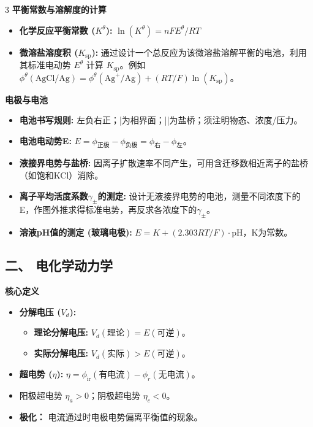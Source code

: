 \documentclass[a4paper,6pt]{article} %
\begin{document}
\begin{multicols}{3}
\textbf{平衡常数与溶解度的计算}
\begin{itemize}
    \item \textbf{化学反应平衡常数 ($K^\theta$):} $\ln(K^\theta) = nFE^\theta / RT$
    \item \textbf{微溶盐溶度积 ($K_{\text{sp}}$):} 通过设计一个总反应为该微溶盐溶解平衡的电池，利用其标准电动势 $E^\theta$ 计算 $K_{\text{sp}}$。例如 $\phi^\theta(\text{AgCl/Ag}) = \phi^\theta(\text{Ag}^+/\text{Ag}) + (RT/F)\ln(K_{\text{sp}})$。
\end{itemize}

\textbf{电极与电池}
\begin{itemize}
    \item \textbf{电池书写规则:} 左负右正；|为相界面；||为盐桥；须注明物态、浓度/压力。
    \item \textbf{电池电动势E:} $E = \phi_{\text{正极}} - \phi_{\text{负极}} = \phi_{\text{右}} - \phi_{\text{左}}$。
    \item \textbf{液接界电势与盐桥:} 因离子扩散速率不同产生，可用含迁移数相近离子的盐桥（如饱和KCl）消除。
    \item \textbf{离子平均活度系数$\gamma_\pm$的测定:} 设计无液接界电势的电池，测量不同浓度下的E，作图外推求得标准电势，再反求各浓度下的$\gamma_\pm$。
    \item \textbf{溶液pH值的测定 (玻璃电极):} $E = K + (2.303RT/F) \cdot \text{pH}$，K为常数。
\end{itemize}

\subsection*{二、 电化学动力学}
\textbf{核心定义}
\begin{itemize}
    \item \textbf{分解电压 ($V_d$):}
    \begin{itemize}
        \item \textbf{理论分解电压:} $V_d(\text{理论}) = E(\text{可逆})$。
        \item \textbf{实际分解电压:} $V_d(\text{实际}) > E(\text{可逆})$。
    \end{itemize}
    \item \textbf{超电势 ($\eta$):} $\eta = \phi_{\text{ir}} (\text{有电流}) - \phi_r (\text{无电流})$。
    \item 阳极超电势 $\eta_a > 0$；阴极超电势 $\eta_c < 0$。
    \item \textbf{极化：} 电流通过时电极电势偏离平衡值的现象。
\end{itemize}


\end{multicols}
\end{document}
